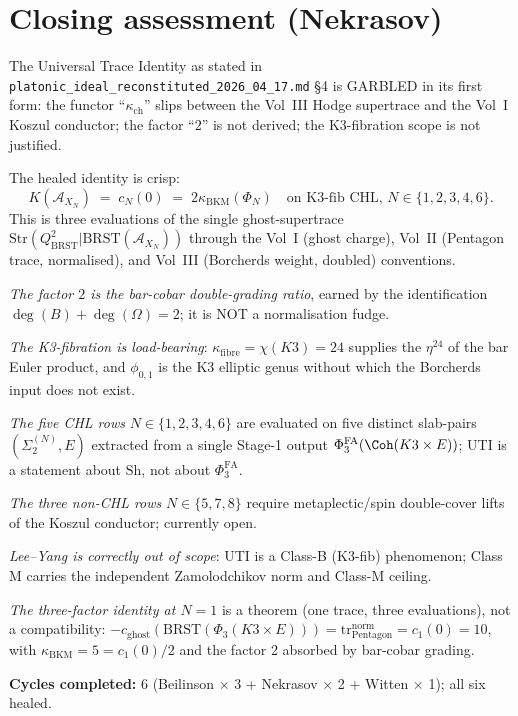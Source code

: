 \documentclass[11pt]{amsart}
\theoremstyle{definition}
\theoremstyle{remark}
\newcommand{\kch}{\kappa_{\mathrm{ch}}}
\newcommand{\kBKM}{\kappa_{\mathrm{BKM}}}
\newcommand{\kfiber}{\kappa_{\mathrm{fibre}}}
\newcommand{\BRST}{\mathrm{BRST}}
\newcommand{\PhiFA}{\Phi^{\mathrm{FA}}}
\begin{document}
\section{Closing assessment (Nekrasov)}

The Universal Trace Identity as stated in \texttt{platonic\_ideal\_reconstituted\_2026\_04\_17.md}
\S4 is GARBLED in its first form: the functor ``$\kch$'' slips between the Vol~III Hodge
supertrace and the Vol~I Koszul conductor; the factor ``$2$'' is not derived; the
K3-fibration scope is not justified.

The healed identity is crisp:
\[
\boxed{\quad K(\mathcal{A}_{X_N}) \;=\; c_N(0) \;=\; 2 \kBKM(\Phi_N) \quad \text{on K3-fib CHL, } N \in \{1, 2, 3, 4, 6\}. \quad}
\]
This is three evaluations of the single ghost-supertrace $\mathrm{Str}(Q_{\BRST}^2 | \BRST(\mathcal{A}_{X_N}))$
through the Vol~I (ghost charge), Vol~II (Pentagon trace, normalised), and Vol~III (Borcherds
weight, doubled) conventions.

\emph{The factor $2$ is the bar-cobar double-grading ratio}, earned by the identification
$\deg(B) + \deg(\Omega) = 2$; it is NOT a normalisation fudge.

\emph{The K3-fibration is load-bearing}: $\kfiber = \chi(K3) = 24$ supplies the $\eta^{24}$ of the
bar Euler product, and $\phi_{0,1}$ is the K3 elliptic genus without which the Borcherds input
does not exist.

\emph{The five CHL rows} $N \in \{1, 2, 3, 4, 6\}$ are evaluated on five distinct slab-pairs
$(\Sigma_2^{(N)}, E)$ extracted from a single Stage-1 output $\PhiFA_3(\Coh(K3 \times E))$; UTI
is a statement about $\mathrm{Sh}$, not about $\PhiFA_3$.

\emph{The three non-CHL rows} $N \in \{5, 7, 8\}$ require metaplectic/spin double-cover
lifts of the Koszul conductor; currently open.

\emph{Lee--Yang is correctly out of scope}: UTI is a Class-B (K3-fib) phenomenon; Class M
carries the independent Zamolodchikov norm and Class-M ceiling.

\emph{The three-factor identity at $N = 1$} is a theorem (one trace, three evaluations), not
a compatibility: $-c_{\mathrm{ghost}}(\BRST(\Phi_3(K3 \times E))) =
\mathrm{tr}_{\mathrm{Pentagon}}^{\mathrm{norm}} = c_1(0) = 10$, with
$\kBKM = 5 = c_1(0)/2$ and the factor 2 absorbed by bar-cobar grading.

\textbf{Cycles completed:} 6 (Beilinson $\times$ 3 + Nekrasov $\times$ 2 + Witten $\times$ 1);
all six healed.
\end{document}
